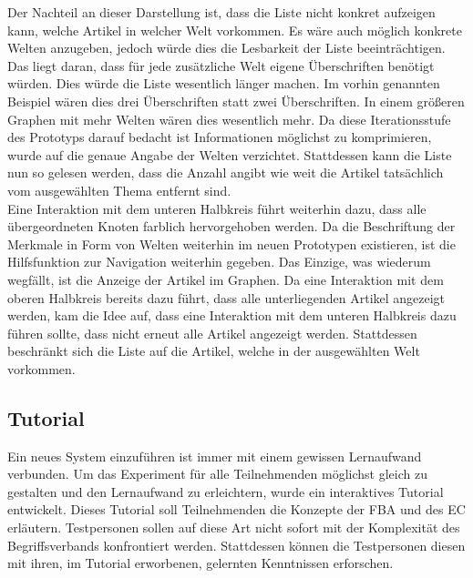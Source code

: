 Der Nachteil an dieser Darstellung ist, dass die Liste nicht konkret aufzeigen kann, welche Artikel in welcher Welt vorkommen.
Es wäre auch möglich konkrete Welten anzugeben, jedoch würde dies die Lesbarkeit der Liste beeinträchtigen.
Das liegt daran, dass für jede zusätzliche Welt eigene Überschriften benötigt würden.
Dies würde die Liste wesentlich länger machen.
Im vorhin genannten Beispiel wären dies drei Überschriften statt zwei Überschriften.
In einem größeren Graphen mit mehr Welten wären dies wesentlich mehr.
Da diese Iterationsstufe des Prototyps darauf bedacht ist Informationen möglichst zu komprimieren, wurde auf die genaue Angabe der Welten verzichtet.
Stattdessen kann die Liste nun so gelesen werden, dass die Anzahl angibt wie weit die Artikel tatsächlich vom ausgewählten Thema entfernt sind.\\

Eine Interaktion mit dem unteren Halbkreis führt weiterhin dazu, dass alle übergeordneten Knoten farblich hervorgehoben werden.
Da die Beschriftung der Merkmale in Form von Welten weiterhin im neuen Prototypen existieren, ist die Hilfsfunktion zur Navigation weiterhin gegeben.
Das Einzige, was wiederum wegfällt, ist die Anzeige der Artikel im Graphen.
Da eine Interaktion mit dem oberen Halbkreis bereits dazu führt, dass alle unterliegenden Artikel angezeigt werden, kam die Idee auf, dass eine Interaktion mit dem unteren Halbkreis dazu führen sollte, dass nicht erneut alle Artikel angezeigt werden.
Stattdessen beschränkt sich die Liste auf die Artikel, welche in der ausgewählten Welt vorkommen. \\

\subsection{Tutorial}
Ein neues System einzuführen ist immer mit einem gewissen Lernaufwand verbunden.
Um das Experiment für alle Teilnehmenden möglichst gleich zu gestalten und den Lernaufwand zu erleichtern, wurde ein interaktives Tutorial entwickelt.
Dieses Tutorial soll Teilnehmenden die Konzepte der \ac{FBA} und des \ac{EC} erläutern.
Testpersonen sollen auf diese Art nicht sofort mit der Komplexität des Begriffsverbands konfrontiert werden.
Stattdessen können die Testpersonen diesen mit ihren, im Tutorial erworbenen, gelernten Kenntnissen erforschen.\\

